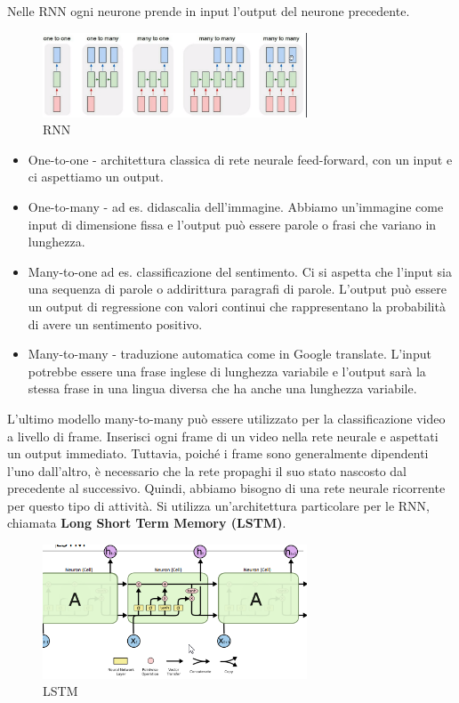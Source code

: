 Nelle RNN ogni neurone prende in input l'output del neurone precedente.
\begin{figure}[H]
    \centering
    \includegraphics[width=0.7\textwidth]{images/archRNN.png}
    \caption{RNN}
\end{figure}

\begin{itemize}
    \item One-to-one - architettura classica di rete neurale feed-forward, con un input e
          ci aspettiamo un output.
    \item One-to-many - ad es. didascalia dell'immagine. Abbiamo un'immagine come input
          di dimensione fissa e l'output può essere parole o frasi che variano in
          lunghezza.
    \item Many-to-one ad es. classificazione del sentimento. Ci si aspetta che l'input
          sia una sequenza di parole o addirittura paragrafi di parole. L'output può
          essere un output di regressione con valori continui che rappresentano la
          probabilità di avere un sentimento positivo.
    \item Many-to-many - traduzione automatica come in Google translate. L'input potrebbe
          essere una frase inglese di lunghezza variabile e l'output sarà la stessa frase
          in una lingua diversa che ha anche una lunghezza variabile.
\end{itemize}

L'ultimo modello many-to-many può essere utilizzato per la classificazione
video a livello di frame. Inserisci ogni frame di un video nella rete neurale e
aspettati un output immediato. Tuttavia, poiché i frame sono generalmente
dipendenti l'uno dall'altro, è necessario che la rete propaghi il suo stato
nascosto dal precedente al successivo. Quindi, abbiamo bisogno di una rete
neurale ricorrente per questo tipo di attività. Si utilizza un'architettura
particolare per le RNN, chiamata \textbf{Long Short Term Memory (LSTM)}.
\begin{figure}[H]
    \centering
    \includegraphics[width=0.7\textwidth]{images/LSTM.png}
    \caption{LSTM}
\end{figure}

